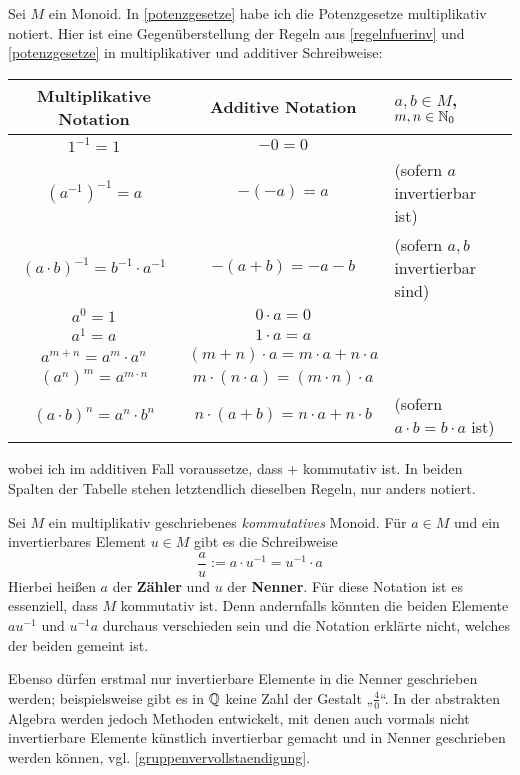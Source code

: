 \begin{bem}[*] \label{brueche}
    Sei $M$ ein Monoid. In \cref{potenzgesetze} habe ich die Potenzgesetze multiplikativ notiert. Hier ist eine Gegenüberstellung der Regeln aus \cref{regelnfuerinv} und \cref{potenzgesetze} in multiplikativer und additiver Schreibweise:
    \begin{center}
    \begin{tabular}{ccl}
        Multiplikative Notation & Additive Notation & $a,b\in M$,\ $m,n\in \mathbb N_0$\\
        \midrule
        $1^{-1} = 1$ & $-0=0$ & \\
        $(a^{-1})^{-1} = a$ & $-(-a)=a$ & (sofern $a$ invertierbar ist) \\
        $(a\cdot b)^{-1} = b^{-1}\cdot a^{-1}$ & $-(a+b) = -a - b$ & (sofern $a,b$ invertierbar sind) \\
        $a^0 = 1$ & $0\cdot a = 0$ & \\
        $a^1 = a$ & $1\cdot a=a$ &\\
        $a^{m+n} = a^m\cdot a^n$ & $(m+n)\cdot a = m\cdot a + n\cdot a$ & \\
        $(a^n)^m = a^{m\cdot n}$ & $m\cdot (n\cdot a) = (m\cdot n)\cdot a$ & \\
        $(a\cdot b)^n =a^n\cdot b^n$ & $n\cdot (a+b) = n\cdot a+n\cdot b$ & (sofern $a\cdot b=b\cdot a$ ist)
    \end{tabular}
    \end{center}
    wobei ich im additiven Fall voraussetze, dass $+$ kommutativ ist. In beiden Spalten der Tabelle stehen letztendlich dieselben Regeln, nur anders notiert.
\end{bem}


\begin{nota}[* Bruchschreibweise]  
    Sei $M$ ein multiplikativ geschriebenes \emph{kommutatives} Monoid. Für $a\in M$ und ein invertierbares Element $u\in M$ gibt es die Schreibweise
        \[ \frac{a}{u} := a\cdot u^{-1} = u^{-1} \cdot a\]
    Hierbei heißen $a$ der \textbf{Zähler} und $u$ der \textbf{Nenner}. Für diese Notation ist es essenziell, dass $M$ kommutativ ist. Denn andernfalls könnten die beiden Elemente $au^{-1}$ und $u^{-1}a$ durchaus verschieden sein und die Notation erklärte nicht, welches der beiden gemeint ist.
    
    Ebenso dürfen erstmal nur invertierbare Elemente in die Nenner geschrieben werden; beispielsweise gibt es in $\mathbb Q$ keine Zahl der Gestalt „$\frac{4}{0}$“. In der abstrakten Algebra werden jedoch Methoden entwickelt, mit denen auch vormals nicht invertierbare Elemente künstlich invertierbar gemacht und in Nenner geschrieben werden können, vgl. \cref{gruppenvervollstaendigung}.
\end{nota}


